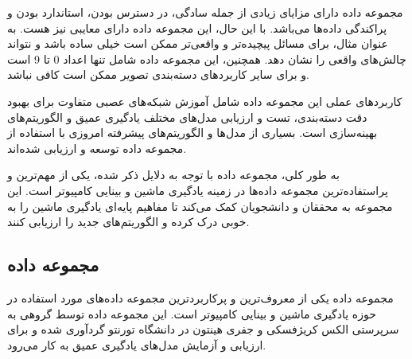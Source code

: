مجموعه داده
دارای مزایای زیادی از جمله سادگی، در دسترس بودن، استاندارد بودن و پراکندگی داده‌ها می‌باشد. با این حال، این مجموعه داده دارای معایبی نیز هست. به عنوان مثال، برای مسائل پیچیده‌تر و واقعی‌تر ممکن است
خیلی ساده باشد و نتواند چالش‌های واقعی را نشان دهد. همچنین، این مجموعه داده شامل تنها اعداد 0 تا 9 است و برای سایر کاربردهای دسته‌بندی تصویر ممکن است کافی نباشد.

کاربردهای عملی این مجموعه داده شامل آموزش شبکه‌های عصبی متفاوت برای بهبود دقت دسته‌بندی، تست و ارزیابی مدل‌های مختلف یادگیری عمیق و الگوریتم‌های بهینه‌سازی است. بسیاری از مدل‌ها و الگوریتم‌های پیشرفته امروزی با استفاده از مجموعه داده
توسعه و ارزیابی شده‌اند.

به طور کلی، مجموعه داده
با توجه به دلایل ذکر شده، یکی از مهم‌ترین و پراستفاده‌ترین مجموعه داده‌ها در زمینه یادگیری ماشین و بینایی کامپیوتر است. این مجموعه به محققان و دانشجویان کمک می‌کند تا مفاهیم پایه‌ای یادگیری ماشین را به خوبی درک کرده و الگوریتم‌های جدید را ارزیابی کنند.


\subsection{
	مجموعه داده
}
مجموعه داده
یکی از معروف‌ترین و پرکاربردترین مجموعه داده‌های مورد استفاده در حوزه یادگیری ماشین و بینایی کامپیوتر است. این مجموعه داده توسط گروهی به سرپرستی الکس کریژفسکی%
و جفری هینتون%
در دانشگاه تورنتو گردآوری شده و برای ارزیابی و آزمایش مدل‌های یادگیری عمیق به کار می‌رود.


